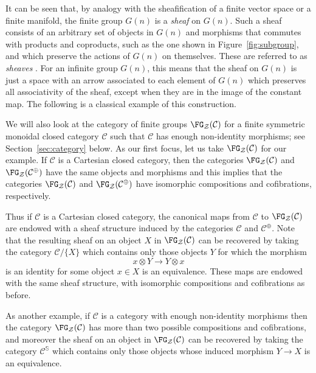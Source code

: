 \documentclass[a4paper,reqno,oneside]{article}
\begin{document}
It can be seen that, by analogy with the sheafification of a finite vector space or a finite manifold, the finite group $G(n)$ is a \emph{sheaf} on $G(n)$. Such a sheaf consists of an arbitrary set of objects in $G(n)$ and morphisms that commutes with products and coproducts, such as the one shown in Figure~\ref{fig:subgroup}, and which preserve the actions of $G(n)$ on themselves. 
These are referred to as \emph{sheaves} \cite{KellyGroup}. For an infinite group $G(n)$, this means that the sheaf on $G(n)$ is just a space with an arrow associated to each element of $G(n)$ which preserves all associativity of the sheaf, except when they are in the image of the constant map. The following is a classical example of this construction.

We will also look at the category of finite groups $\FG_{\mathcal{Z}}(\mathcal{C})$ for a finite symmetric monoidal closed category $\mathcal{C}$ such that $\mathcal{C}$ has enough non-identity morphisms; see Section~\ref{sec:category} below. As our first focus, let us take $\FG_{\mathcal{Z}}(\mathcal{C})$ for our example. If $\mathcal{C}$ is a Cartesian closed category, then the categories $\FG_{\mathcal{Z}}(\mathcal{C})$ and $\FG_{\mathcal{Z}}(\mathcal{C}^{\oplus})$ have the same objects and morphisms and this implies that the categories $\FG_{\mathcal{Z}}(\mathcal{C})$ and $\FG_{\mathcal{Z}}(\mathcal{C}^{\oplus})$ have isomorphic compositions and cofibrations, respectively. 

Thus if $\mathcal{C}$ is a Cartesian closed category, the canonical maps from $\mathcal{C}$ to $\FG_{\mathcal{Z}}(\mathcal{C})$ are endowed with a sheaf structure induced by the categories $\mathcal{C}$ and $\mathcal{C}^{\oplus}$. Note that the resulting sheaf on an object $X$ in $\FG_{\mathcal{Z}}(\mathcal{C})$ can be recovered by taking the category $\mathcal{C}/\{X\}$ which contains only those objects $Y$ for which the morphism
\[
x \otimes Y \rightarrow Y \otimes x
\]
is an identity for some object $x \in X$ is an equivalence. These maps are endowed with the same sheaf structure, with isomorphic compositions and cofibrations as before.

As another example, if $\mathcal{C}$ is a category with enough non-identity morphisms then the category $\FG_{\mathcal{Z}}(\mathcal{C})$ has more than two possible compositions and cofibrations, and moreover the sheaf on an object in $\FG_{\mathcal{Z}}(\mathcal{C})$ can be recovered by taking the category $\mathcal{C}^{\mathbb{S}}$ which contains only those objects whose induced morphism $Y \rightarrow X$ is an equivalence.
\end{document}
